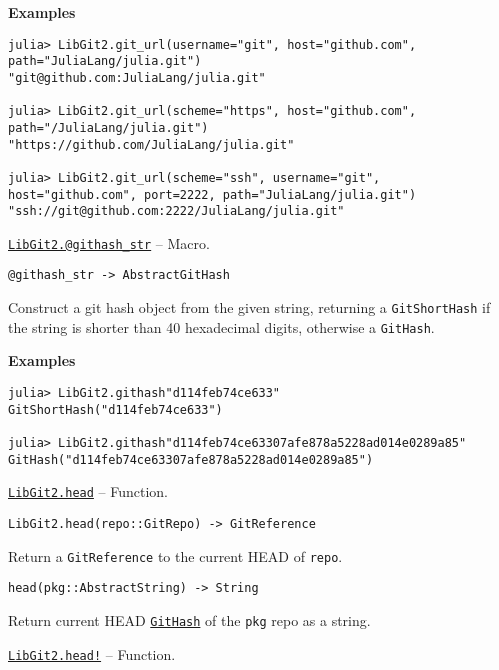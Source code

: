 \begin{adjustwidth}{2em}{0pt}
\begin{quote}
\end{quote}
\textbf{Examples}


\begin{verbatim}
julia> LibGit2.git_url(username="git", host="github.com", path="JuliaLang/julia.git")
"git@github.com:JuliaLang/julia.git"

julia> LibGit2.git_url(scheme="https", host="github.com", path="/JuliaLang/julia.git")
"https://github.com/JuliaLang/julia.git"

julia> LibGit2.git_url(scheme="ssh", username="git", host="github.com", port=2222, path="JuliaLang/julia.git")
"ssh://git@github.com:2222/JuliaLang/julia.git"
\end{verbatim}



\end{adjustwidth}
\hypertarget{6260170502036665222}{}
\hyperlink{6260170502036665222}{\texttt{LibGit2.@githash\_str}}  -- {Macro.}

\begin{adjustwidth}{2em}{0pt}


\begin{verbatim}
@githash_str -> AbstractGitHash
\end{verbatim}

Construct a git hash object from the given string, returning a \texttt{GitShortHash} if the string is shorter than 40 hexadecimal digits, otherwise a \texttt{GitHash}.

\textbf{Examples}


\begin{verbatim}
julia> LibGit2.githash"d114feb74ce633"
GitShortHash("d114feb74ce633")

julia> LibGit2.githash"d114feb74ce63307afe878a5228ad014e0289a85"
GitHash("d114feb74ce63307afe878a5228ad014e0289a85")
\end{verbatim}



\end{adjustwidth}
\hypertarget{14955163669937294027}{}
\hyperlink{14955163669937294027}{\texttt{LibGit2.head}}  -- {Function.}

\begin{adjustwidth}{2em}{0pt}


\begin{verbatim}
LibGit2.head(repo::GitRepo) -> GitReference
\end{verbatim}

Return a \texttt{GitReference} to the current HEAD of \texttt{repo}.




\begin{lstlisting}
head(pkg::AbstractString) -> String
\end{lstlisting}

Return current HEAD \hyperlink{202290709580230708}{\texttt{GitHash}} of the \texttt{pkg} repo as a string.



\end{adjustwidth}
\hypertarget{16482865322979618348}{}
\hyperlink{16482865322979618348}{\texttt{LibGit2.head!}}  -- {Function.}


